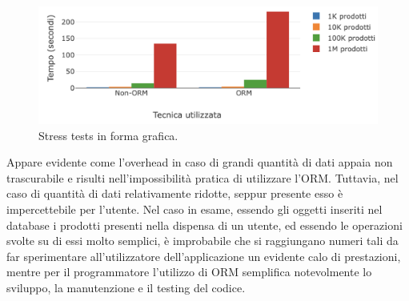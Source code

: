 \begin{figure}[H]
  \includegraphics[width=\linewidth]{images/stress-tests-diagram.png}
  \caption{Stress tests in forma grafica.}
  \label{fig:stresstests}
\end{figure}

Appare evidente come l'overhead in caso di grandi quantità di dati appaia non trascurabile e risulti nell'impossibilità pratica di utilizzare l'ORM. Tuttavia, nel caso di quantità di dati relativamente ridotte, seppur presente esso è impercettebile per l'utente. Nel caso in esame, essendo gli oggetti inseriti nel database i prodotti presenti nella dispensa di un utente, ed essendo le operazioni svolte su di essi molto semplici, è improbabile che si raggiungano numeri tali da far sperimentare all'utilizzatore dell'applicazione un evidente calo di prestazioni, mentre per il programmatore l'utilizzo di ORM semplifica notevolmente lo sviluppo, la manutenzione e il testing del codice.
